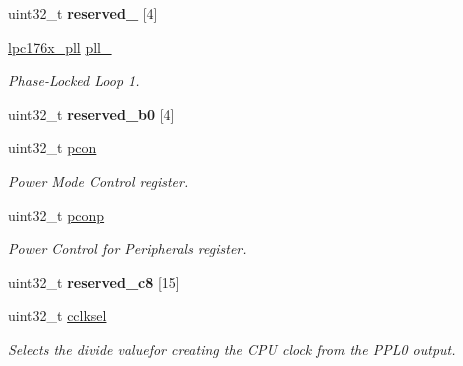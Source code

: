 \begin{DoxyCompactItemize}
\mbox{\label{structlpc176x__scb_a5a295cf42985cac167ad4c9d0e9f5ece}} 
uint32\+\_\+t {\bfseries reserved\+\_} \mbox{[}4\mbox{]}
\item 
\mbox{\label{structlpc176x__scb_a3948c8d59a5d442a6a8d32fbf7a8fe82}} 
\mbox{\hyperlink{structlpc176x__pll}{lpc176x\+\_\+pll}} \mbox{\hyperlink{structlpc176x__scb_a3948c8d59a5d442a6a8d32fbf7a8fe82}{pll\+\_}}
\begin{DoxyCompactList}\small\item\em Phase-\/\+Locked Loop 1. \end{DoxyCompactList}\item 
\mbox{\label{structlpc176x__scb_ad3fb02f6f827c0f1181c3c6404313294}} 
uint32\+\_\+t {\bfseries reserved\+\_\+b0} \mbox{[}4\mbox{]}
\item 
\mbox{\label{structlpc176x__scb_ab04467477137f0b74770f01ab5cad600}} 
uint32\+\_\+t \mbox{\hyperlink{structlpc176x__scb_ab04467477137f0b74770f01ab5cad600}{pcon}}
\begin{DoxyCompactList}\small\item\em Power Mode Control register. \end{DoxyCompactList}\item 
\mbox{\label{structlpc176x__scb_a5e1c3480c9372795bd5bf540e6e4d584}} 
uint32\+\_\+t \mbox{\hyperlink{structlpc176x__scb_a5e1c3480c9372795bd5bf540e6e4d584}{pconp}}
\begin{DoxyCompactList}\small\item\em Power Control for Peripherals register. \end{DoxyCompactList}\item 
\mbox{\label{structlpc176x__scb_a40c890229194d0a573a259e55c8f1d44}} 
uint32\+\_\+t {\bfseries reserved\+\_\+c8} \mbox{[}15\mbox{]}
\item 
\mbox{\label{structlpc176x__scb_a93a9cd9b212b3051554efc955acad8e6}} 
uint32\+\_\+t \mbox{\hyperlink{structlpc176x__scb_a93a9cd9b212b3051554efc955acad8e6}{cclksel}}
\begin{DoxyCompactList}\small\item\em Selects the divide valuefor creating the C\+PU clock from the P\+P\+L0 output. \end{DoxyCompactList}\item 

\end{DoxyCompactItemize}
